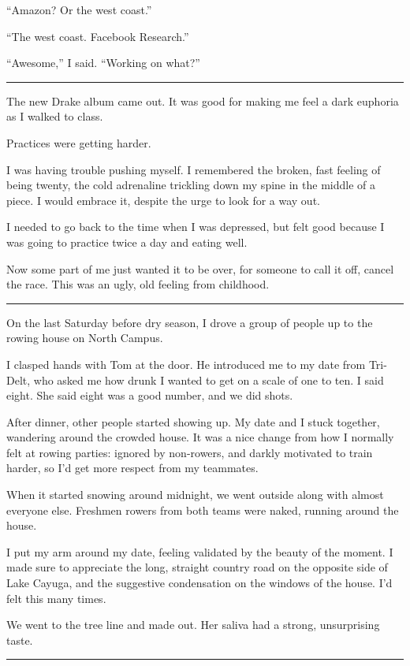 ``Amazon?  Or the west coast.''

``The west coast.  Facebook Research.''

``Awesome,'' I said.  ``Working on what?''

\plainfancybreak{12pt}{2}{}

The new Drake album came out.  It was good for making me feel a dark euphoria
as I walked to class.

Practices were getting harder.

I was having trouble pushing myself.  I remembered the broken, fast feeling of
being twenty, the cold adrenaline trickling down my spine in the middle of a
piece.  I would embrace it, despite the urge to look for a way out.

I needed to go back to the time when I was depressed, but felt good because I
was going to practice twice a day and eating well.

Now some part of me just wanted it to be over, for someone to call it off,
cancel the race.  This was an ugly, old feeling from childhood.

\plainfancybreak{12pt}{2}{}

On the last Saturday before dry season, I drove a group of people up to the
rowing house on North Campus.

I clasped hands with Tom at the door.  He introduced me to my date from
Tri-Delt, who asked me how drunk I wanted to get on a scale of one to ten. I
said eight.  She said eight was a good number, and we did shots.

After dinner, other people started showing up.  My date and I stuck together,
wandering around the crowded house.  It was a nice change from how I normally
felt at rowing parties: ignored by non-rowers, and darkly motivated to train
harder, so I'd get more respect from my teammates.

When it started snowing around midnight, we went outside along with almost
everyone else.  Freshmen rowers from both teams were naked, running around the
house.

I put my arm around my date, feeling validated by the beauty of the moment.  I
made sure to appreciate the long, straight country road on the opposite side of
Lake Cayuga, and the suggestive condensation on the windows of the house.  I'd
felt this many times.

We went to the tree line and made out.  Her saliva had a strong, unsurprising
taste.

\plainfancybreak{12pt}{2}{}

